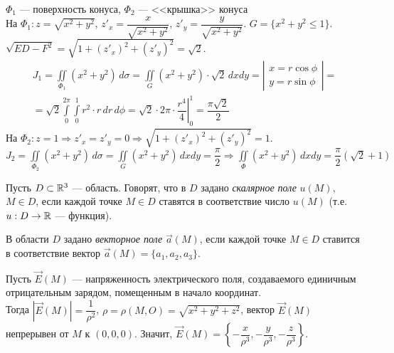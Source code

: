 \documentclass[a4paper,10pt]{article}
\begin{document}
	\begin{solution}
		$\Phi_1$ --- поверхность конуса, $\Phi_2$ --- <<крышка>> конуса\\
		На $\Phi_1: z = \sqrt{x^2 + y^2}$, $z'_x = \dfrac{x}{\sqrt{x^2 + y^2}}$, $z'_y = \dfrac{y}{\sqrt{x^2 + y^2}}$. $G = \{x^2 + y^2 \le 1\}$.\\
		$\sqrt{ED - F^2} = \sqrt{1 + (z'_x)^2 + (z'_y)^2} = \sqrt{2}$. 
		\begin{multline*}
		J_1 = \iint\limits_{\Phi_1} (x^2 + y^2) \, d\sigma = \iint\limits_G (x^2 + y^2) \cdot \sqrt{2} \, dxdy = \left| \begin{matrix}
		x = r \cos \phi \\
		y = r \sin \phi
		\end{matrix} \right| =\\= \sqrt{2} \int\limits_0^{2\pi} \int\limits_0^1 r^2 \cdot r \, dr \, d\phi = \sqrt{2} \cdot 2\pi \cdot \left. \dfrac{r^4}{4} \right|_0^1 = \dfrac{\pi \sqrt{2}}{2}
		\end{multline*}
		На $\Phi_2: z = 1 \Rightarrow z'_x = z'_y = 0 \Rightarrow \sqrt{1 + (z'_x)^2 + (z'_y)^2} = 1$.\\
		$J_2 = \iint\limits_{\Phi_2} (x^2 + y^2) \, d\sigma = \iint\limits_G (x^2 + y^2) \, dxdy = \dfrac{\pi}{2} \Rightarrow \iint\limits_\Phi (x^2 + y^2) \, dxdy = \dfrac{\pi}{2}(\sqrt{2} + 1)$
	\end{solution}
	
	
	\begin{defn}
		Пусть $D \subset {\mathbb R}^3$ --- область. Говорят, что в $D$ задано \textit{скалярное поле} $u(M)$, $M \in D$, если каждой точке $M \in D$ ставятся в соответствие число $u(M)$ (т.е. $u : D \to {\mathbb R}$ --- функция).
		
		В области $D$ задано \textit{векторное поле} $\vec{a}(M)$, если каждой точке $M \in D$ ставится в соответствие вектор $\vec{a}(M) = \{a_1, a_2, a_3\}$.
	\end{defn}
	
	\begin{exmp}
		Пусть $\vec{E}(M)$ --- напряженность электрического поля, создаваемого единичным отрицательным зарядом, помещенным в начало координат. \\ Тогда $\left| \vec{E}(M) \right| = \dfrac{1}{\rho^2}$, $\rho = \rho(M, O) = \sqrt{x^2 + y^2 + z^2}$, вектор $\vec{E}(M)$ непрерывен от $M$ к $(0, 0, 0)$. Значит, $\vec{E}(M) = \left\{ -\dfrac{x}{\rho^3}, -\dfrac{y}{\rho^3}, -\dfrac{z}{\rho^3} \right\}$.
	\end{exmp}
	
\end{document}
